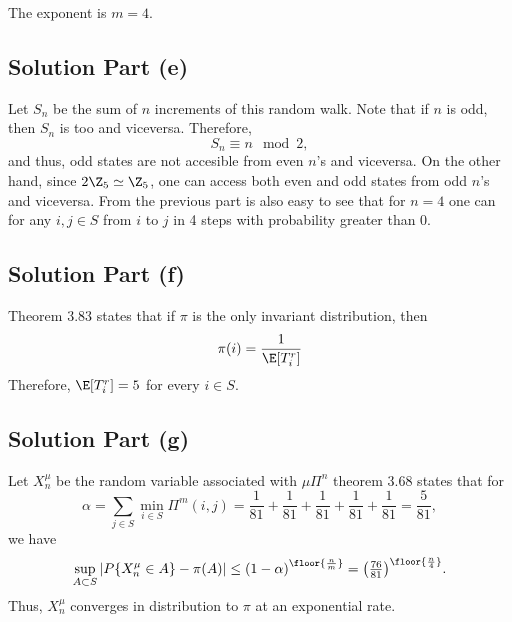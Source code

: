 The exponent is $m = 4$.

\subsection*{Solution Part (e)}

Let $S_n$ be the sum of $n$ increments of this random walk. Note that if $n$ is odd, then $S_n$ is too and viceversa. Therefore,
\[ S_n \equiv n \mod 2, \]
and thus, odd states are not accesible from even $n$'s and viceversa. On the other hand, since $2\Z_5 \simeq \Z_5$, one can access both even and odd states from odd $n$'s and viceversa. From the previous part is also easy to see that for $n = 4$ one can for any $i,j\in S$ from $i$ to $j$ in 4 steps with probability greater than 0.

\subsection*{Solution Part (f)}

Theorem 3.83 states that if $\pi$ is the only invariant distribution, then
\[ \pi(i) = \frac{1}{\E[T_i^r]} \]
Therefore, $\E[T_i^r] = 5$ for every $i\in S$.

\subsection*{Solution Part (g)}
Let $X_n^\mu$ be the random variable associated with $\mu\Pi^n$
theorem 3.68 states that for
\[ \alpha = \sum_{j\in S} \min_{i\in S} \Pi^m(i,j) = \frac{1}{81}+\frac{1}{81}+\frac{1}{81}+\frac{1}{81}+\frac{1}{81} = \frac{5}{81}, \]
we have
\[ \sup_{A\subset S} |P\{X_n^\mu \in A\} - \pi(A)| \leq {(1-\alpha)}^{\floor{\frac{n}{m}}} = {\left( \tfrac{76}{81} \right)}^{\floor{\frac{n}{4}}}. \]
Thus, $X_n^\mu$ converges in distribution to $\pi$ at an exponential rate.
